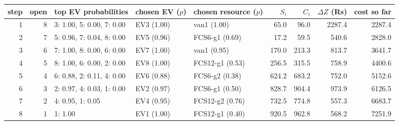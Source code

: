 \footnotesize\begin{adjustbox}{max width=\linewidth}\begin{tabular}{@{}rrlllrrrr@{}}\toprule
step & open & top EV probabilities & chosen EV ($p$) & chosen resource ($p$) & $S_i$ & $C_i$ & $\Delta Z$ (Rs) & cost so far \\\midrule
1 & 8 & 3: 1.00, 5: 0.00, 7: 0.00 & EV3 (1.00) & van1 (1.00) & 65.0 & 96.0 & 2287.4 & 2287.4 \\
2 & 7 & 5: 0.96, 7: 0.04, 8: 0.00 & EV5 (0.96) & FCS6-g1 (0.69) & 17.2 & 59.5 & 540.6 & 2828.0 \\
3 & 6 & 7: 1.00, 8: 0.00, 6: 0.00 & EV7 (1.00) & van1 (0.95) & 170.0 & 213.3 & 813.7 & 3641.7 \\
4 & 5 & 8: 1.00, 6: 0.00, 2: 0.00 & EV8 (1.00) & FCS12-g1 (0.53) & 256.5 & 315.5 & 758.9 & 4400.6 \\
5 & 4 & 6: 0.88, 2: 0.11, 4: 0.00 & EV6 (0.88) & FCS6-g2 (0.38) & 624.2 & 683.2 & 752.0 & 5152.6 \\
6 & 3 & 2: 0.97, 4: 0.03, 1: 0.00 & EV2 (0.97) & FCS6-g1 (0.50) & 828.7 & 904.4 & 973.9 & 6126.5 \\
7 & 2 & 4: 0.95, 1: 0.05 & EV4 (0.95) & FCS12-g2 (0.76) & 732.5 & 774.8 & 557.3 & 6683.7 \\
8 & 1 & 1: 1.00 & EV1 (1.00) & FCS12-g1 (0.40) & 920.5 & 962.8 & 568.2 & 7251.9 \\
\bottomrule\end{tabular}\end{adjustbox}
